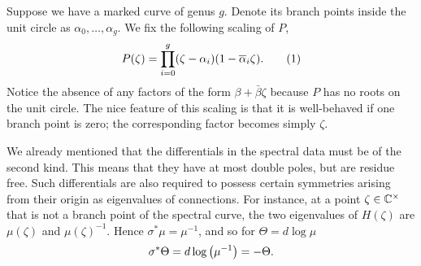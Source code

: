 \documentclass{article}
\begin{document}
Suppose we have a marked curve of genus $g$. Denote its branch points inside the unit circle as $\alpha_0,\ldots,\alpha_g$. We fix the following scaling of $P$,
\[
P(\zeta) = \prod_{i=0}^{g} (\zeta - \alpha_i)(1 -\bar{\alpha}_i \zeta).
\labelthis{eqn:def P}
\]
Notice the absence of any factors of the form $\beta + \bar{\beta}\zeta$ because $P$ has no roots on the unit circle. The nice feature of this scaling is that it is well-behaved if one branch point is zero; the corresponding factor becomes simply $\zeta$.


We already mentioned that the differentials in the spectral data must be of the second kind. This means that they have at most double poles, but are residue free. Such differentials are also required to possess certain symmetries arising from their origin as eigenvalues of connections. For instance, at a point $\zeta\in\mathbb{C}^\times$ that is not a branch point of the spectral curve, the two eigenvalues of $H(\zeta)$ are $\mu(\zeta)$ and $\mu(\zeta)^{-1}$. Hence $\sigma^*\mu = \mu^{-1}$, and so for $\Theta = d \log \mu$
\[
\sigma^* \Theta = d \log \left( \mu^{-1} \right) = - \Theta.
\]
\end{document}
